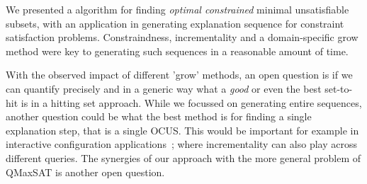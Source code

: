 We presented a \hitsetbased algorithm for finding \textit{optimal constrained} minimal unsatisfiable subsets, with an application in generating explanation sequence for constraint satisfaction problems. Constraindness, incrementality and a domain-specific grow method were key to generating such sequences in a reasonable amount of time.




With the observed impact of different 'grow' methods, an open question is if we can quantify precisely and in a generic way what a \textit{good} or even the best set-to-hit is in a hitting set approach. While we focussed on generating entire sequences, another question could be what the best method is for finding a single explanation step, that is a single OCUS. This would be important for example in interactive configuration applications~\cite{janota2010sat}; where incrementality can also play across different queries.
The synergies of our approach with the more general problem of 
QMaxSAT \cite{DBLP:journals/constraints/IgnatievJM16} is another open question.


